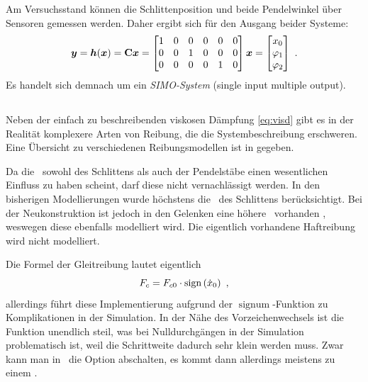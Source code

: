 Am Versuchsstand können die Schlittenposition und beide Pendelwinkel über Sensoren gemessen werden. Daher ergibt sich für den Ausgang beider Systeme:
\begin{align}
	\boldsymbol{y} = \boldsymbol{h}(\boldsymbol{x})
	= {\boldsymbol{\mathrm{C}}} \boldsymbol{x}
	= \begin{bmatrix}
		1 & 0 & 0 & 0 & 0 & 0 \\
		0 & 0 & 1 & 0 & 0 & 0 \\
		0 & 0 & 0 & 0 & 1 & 0 
	\end{bmatrix} \boldsymbol{x}
	= \begin{bmatrix}
		x_0 \\ \varphi_1 \\ \varphi_2
	\end{bmatrix}  \ .
	\label{eq:hx}
\end{align}
Es handelt sich demnach um ein \emph{SIMO-System} (single input multiple output). 


\subsection{\crb}\label{sec:crb}

Neben der einfach zu beschreibenden viskosen Dämpfung \eqref{eq:visd} gibt es in der Realität komplexere Arten von Reibung, die die Systembeschreibung erschweren. 
Eine Übersicht zu verschiedenen Reibungsmodellen ist in \cite{ribeiro} gegeben.

Da die \crb\ sowohl des Schlittens als auch der Pendelstäbe einen wesentlichen Einfluss zu haben scheint, darf diese nicht vernachlässigt werden. 
In den bisherigen Modellierungen wurde höchstens die \crb\ des Schlittens berücksichtigt. 
Bei der Neukonstruktion ist jedoch in den Gelenken eine höhere \crb\ vorhanden , weswegen diese ebenfalls modelliert wird.
Die eigentlich vorhandene Haftreibung wird nicht modelliert.

Die Formel der Gleitreibung lautet eigentlich 
	\[
	F_c = F_{c0}  \cdot  \mathrm{sign}\left(\dot{x}_0\right) \ ,
\]
allerdings führt diese Implementierung aufgrund der $\operatorname{signum}$-Funktion  zu Komplikationen in der Simulation.
In der Nähe des Vorzeichenwechsels ist die Funktion unendlich steil, was bei Nulldurchgängen in der Simulation problematisch ist, weil die Schrittweite dadurch sehr klein werden muss.
Zwar kann man in \sm\ die Option  abschalten, es kommt dann allerdings meistens zu einem . 
\cite{modsim}


